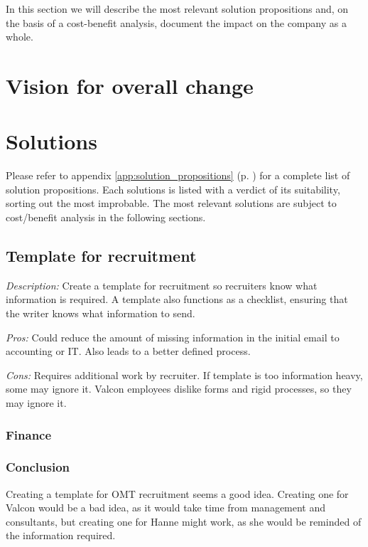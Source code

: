 In this section we will describe the most relevant solution propositions and, on the basis of a cost-benefit analysis, document the impact on the company as a whole.

\section{Vision for overall change}


\section{Solutions}
Please refer to appendix \ref{app:solution_propositions} (p. \pageref{app:solution_propositions}) for a complete list of solution propositions. Each solutions is listed with a verdict of its suitability, sorting out the most improbable.
The most relevant solutions are subject to cost/benefit analysis in the following sections.

\subsection{Template for recruitment}
\emph{Description:} Create a template for recruitment so recruiters know what information is required. A template also functions as a checklist, ensuring that the writer knows what information to send.

\emph{Pros:} Could reduce the amount of missing information in the initial email to accounting or IT. 
Also leads to a better defined process.

\emph{Cons:} Requires additional work by recruiter. 
If template is too information heavy, some may ignore it.
Valcon employees dislike forms and rigid processes, so they may ignore it.

\subsubsection{Finance}

\subsubsection{Conclusion} Creating a template for OMT recruitment seems a good idea.
Creating one for Valcon would be a bad idea, as it would take time from management and consultants, but creating one for Hanne might work, as she would be reminded of the information required.

